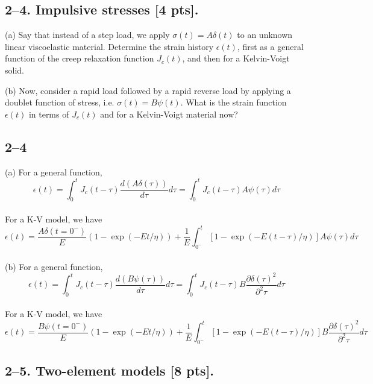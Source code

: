 \bigskip
\subsection*{2--4. \textbf{Impulsive stresses} [4 pts].}

(a) Say that instead of a step load, we apply $\sigma(t) = A \delta(t)$ to an unknown linear viscoelastic material. 
Determine the strain history $\epsilon(t)$, first as a general function of the creep relaxation function $J_c(t)$, and then for a Kelvin-Voigt solid. 

(b) Now, consider a rapid load followed by a rapid reverse load by applying a doublet function of stress, i.e. $\sigma(t) = B \psi(t)$. 
What is the strain function $\epsilon(t)$ in terms of $J_c(t)$ and for a Kelvin-Voigt material now? 

\subsection*{2--4}
(a) 
For a general function, 
\begin{equation*}
    \epsilon(t) = \int^t_0 J_c(t-\tau)\frac{d(A\delta(\tau))}{d\tau}d\tau = \int^t_0 J_c(t-\tau) A \psi(\tau)d\tau
\end{equation*} \\
For a K-V model, we have
\begin{equation*}
    \epsilon(t) = \frac{A\delta(t=0^-)}{E}(1-\exp(-Et/\eta)) + \frac1E \int^t_{0^-}[1-\exp(-E(t-\tau)/\eta)]A\psi(\tau)d\tau
\end{equation*} \\

(b)
For a general function, 
\begin{equation*}
    \epsilon(t) = \int^t_0 J_c(t-\tau)\frac{d(B\psi(\tau))}{d\tau}d\tau = \int^t_0 J_c(t-\tau) B \frac{\partial \delta(\tau)^2}{\partial^2 \tau}d\tau
\end{equation*} \\
For a K-V model, we have
\begin{equation*}
    \epsilon(t) = \frac{B\psi(t=0^-)}{E}(1-\exp(-Et/\eta)) + \frac1E \int^t_{0^-}[1-\exp(-E(t-\tau)/\eta)]B \frac{\partial \delta(\tau)^2}{\partial^2 \tau}d\tau
\end{equation*}

\bigskip
\subsection*{2--5. \textbf{Two-element models} [8 pts].}

